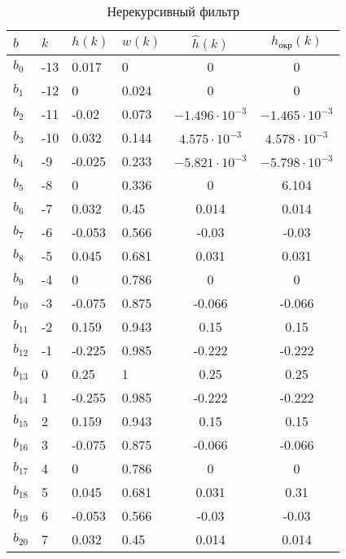 \label{sec:AppendixA}
\begin{table}[h!]
  \caption{Нерекурсивный фильтр}
  \begin{tabular}{|p{1.5cm}|p{1.5cm}|p{1.5cm}|p{1.5cm}|c|c|}
    \hline
    $b$ & $k$ & $h(k)$ & $w(k)$ & $\hat h(k)$ & $h_{\text{окр}}(k)$ \\
    \hline
    $b_0$  & -13 & 0.017 & 0 & 0 & 0 \\
    \hline
    $b_1$  & -12 & 0 & 0.024 & 0 & 0 \\
    \hline
    $b_2$  & -11 & -0.02 & 0.073 & $-1.496\cdot10^{-3}$ & $-1.465\cdot10^{-3}$ \\
    \hline
    $b_3$  & -10 & 0.032 & 0.144 & $4.575\cdot10^{-3}$ & $4.578\cdot10^{-3}$ \\
    \hline
    $b_4$  & -9 & -0.025 & 0.233 & $-5.821\cdot10^{-3}$ & $-5.798\cdot10^{-3}$ \\
    \hline
    $b_5$  & -8 & 0 & 0.336 & 0 & 6.104 \\
    \hline
    $b_6$  & -7 & 0.032 & 0.45 & 0.014 & 0.014 \\
    \hline
    $b_7$  & -6 & -0.053 & 0.566 & -0.03 & -0.03 \\
    \hline
    $b_8$  & -5 & 0.045 & 0.681 & 0.031 & 0.031 \\
    \hline
    $b_9$  & -4 & 0 & 0.786 & 0 & 0 \\
    \hline
    $b_{10}$  & -3 & -0.075 & 0.875 & -0.066 & -0.066 \\
    \hline
    $b_{11}$  & -2 & 0.159 & 0.943 & 0.15 & 0.15 \\
    \hline
    $b_{12}$  & -1 & -0.225 & 0.985 & -0.222 & -0.222 \\
    \hline
    $b_{13}$  & 0 & 0.25 & 1 & 0.25 & 0.25 \\
    \hline
    $b_{14}$  & 1 & -0.255 & 0.985 & -0.222 & -0.222 \\
    \hline
    $b_{15}$  & 2 & 0.159 & 0.943 & 0.15 & 0.15 \\
    \hline
    $b_{16}$  & 3 & -0.075 & 0.875 & -0.066 & -0.066 \\
    \hline
    $b_{17}$  & 4 & 0 & 0.786 & 0 & 0 \\
    \hline
    $b_{18}$  & 5 & 0.045 & 0.681 & 0.031 & 0.31 \\
    \hline
    $b_{19}$  & 6 & -0.053 & 0.566 & -0.03 & -0.03 \\
    \hline
    $b_{20}$  & 7 & 0.032 & 0.45 & 0.014 & 0.014 \\

\end{tabular}
\end{table}
